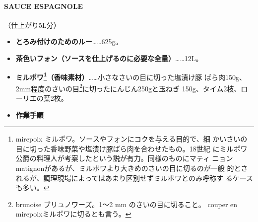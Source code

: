 \begin{recette}
\hypertarget{sauce-espagnole}{%
\paragraph{SAUCE ESPAGNOLE}\label{sauce-espagnole}}

   

（仕上がり5L分）

\begin{itemize}
\item
  \textbf{とろみ付けのためのルー}\ldots{}\ldots{}625g。
\item
  \textbf{茶色いフォン（ソースを仕上げるのに必要な全量）}\ldots{}\ldots{}12L。
\item
  \textbf{ミルポワ\footnote{mirepoix
    ミルポワ。ソースやフォンにコクを与える目的で、細
    かいさいの目に切った香味野菜や塩漬け豚ばら肉を合わせたもの。18世紀
    にミルポワ公爵の料理人が考案したという説が有力。同様のものにマティ
    ニョンmatignonがあるが、ミルポワより大きめのさいの目に切るのが一般
    的とされるが、調理現場によってはあまり区別せずミルポワとのみ呼称す
    るケースも多い。}（香味素材）}\ldots{}\ldots{}小さなさいの目に切った塩漬け豚
  ばら肉150g、2mm程度のさいの目\footnote{brunoise ブリュノワーズ。1〜2
    mm のさいの目に切ること。 couper en mirepoixミルポワに切るとも言う。}に切ったにんじん250gと玉ねぎ
  150g、タイム2枝、ローリエの葉2枚。\hypertarget{mirepoix}{}
  \label{mirepoix}
\item
  \textbf{作業手順}
\end{itemize}


\end{recette}
